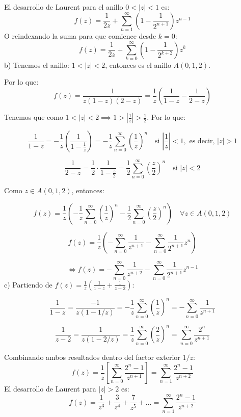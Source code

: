 {El desarrollo de Laurent para el anillo $0 < |z| < 1$ es:
\[ f(z) = \frac{1}{2z} + \sum_{n=1}^{\infty} \left( 1 - \frac{1}{2^{n+1}} \right) z^{n-1} \]
O reindexando la suma para que comience desde $k=0$:
\[ f(z) = \frac{1}{2z} + \sum_{k=0}^{\infty} \left( 1 - \frac{1}{2^{k+2}} \right) z^k \]
b) Tenemos el anillo: $1 < |z| < 2$, entonces es el anillo $A(0, 1, 2)$.

\noindent Por lo que:
\[
f(z) = \frac{1}{z(1-z)(2-z)} = \frac{1}{z} \left( \frac{1}{1-z} - \frac{1}{2-z} \right)
\]

\noindent Tenemos que como $1 < |z| < 2 \implies 1 > \left| \frac{1}{z} \right| > \frac{1}{2}$. Por lo que:

\[
\frac{1}{1-z} = -\frac{1}{z} \left( \frac{1}{1-\frac{1}{z}} \right) = -\frac{1}{z} \sum_{n=0}^{\infty} \left( \frac{1}{z} \right)^n \quad \text{si } \left| \frac{1}{z} \right| < 1, \text{ es decir, } |z| > 1
\]

\[
\frac{1}{2-z} = \frac{1}{2} \cdot \frac{1}{1-\frac{z}{2}} = \frac{1}{2} \sum_{n=0}^{\infty} \left( \frac{z}{2} \right)^n \quad \text{si } |z| < 2
\]

\noindent Como $z \in A(0, 1, 2)$, entonces:

\[
f(z) = \frac{1}{z} \left( -\frac{1}{z} \sum_{n=0}^{\infty} \left( \frac{1}{z} \right)^n - \frac{1}{2} \sum_{n=0}^{\infty} \left( \frac{z}{2} \right)^n \right) \quad \forall z \in A(0, 1, 2)
\]

\[
f(z) = \frac{1}{z} \left( -\sum_{n=0}^{\infty} \frac{1}{z^{n+1}} - \sum_{n=0}^{\infty} \frac{1}{2^{n+1}} z^n \right)
\]

\[
\iff f(z) = -\sum_{n=0}^{\infty} \frac{1}{z^{n+2}} - \sum_{n=0}^{\infty} \frac{1}{2^{n+1}} z^{n-1}
\]
c)
Partiendo de $f(z) = \frac{1}{z} \left( \frac{1}{1-z} + \frac{1}{z-2} \right)$:
    
    \[ \frac{1}{1-z} = \frac{-1}{z(1 - 1/z)} = -\frac{1}{z} \sum_{n=0}^{\infty} \left( \frac{1}{z} \right)^n = -\sum_{n=0}^{\infty} \frac{1}{z^{n+1}} \]
    
 
    \[ \frac{1}{z-2} = \frac{1}{z(1 - 2/z)} = \frac{1}{z} \sum_{n=0}^{\infty} \left( \frac{2}{z} \right)^n = \sum_{n=0}^{\infty} \frac{2^n}{z^{n+1}} \]



Combinando ambos resultados dentro del factor exterior $1/z$:
\[ f(z) = \frac{1}{z} \left[ \sum_{n=0}^{\infty} \frac{2^n - 1}{z^{n+1}} \right] = \sum_{n=1}^{\infty} \frac{2^n - 1}{z^{n+2}} \]
El desarrollo de Laurent para $|z| > 2$ es:
\[ f(z) = \frac{1}{z^3} + \frac{3}{z^4} + \frac{7}{z^5} + \dots = \sum_{n=1}^{\infty} \frac{2^n - 1}{z^{n+2}} \]

}
